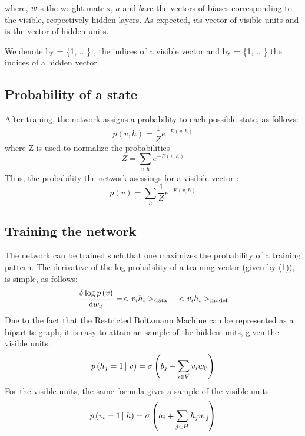 where, $w_{{{}}}$is the weight matrix, $a$ and $b$are the
vectors of biases corresponding to the visible, respectively hidden layers. As
expected, $v$is vector of visible units and  is the vector of
hidden units.

We denote by  = \{1, ..  \} , the
indices of a visible vector and by  = \{1, .. 
\} the indices of a hidden vector.



\subsection{Probability of a state}

After traning, the network assigns a probability to each possible state, as
follows:
\[ p \left( v, h \right) = \frac{1}{Z} e^{- E \left( v, h \right)} \]
where Z is used to normalize the probabilities
\[ Z = \sum_{v, h} e^{- E \left( v, h \right)} \]
Thus, the probability the network asessings for a visibile vector :
\begin{equation}
  p \left( v \right) = \sum_h \frac{1}{Z} e^{- E \left( v, h \right)}
\end{equation}

\subsection{Training the network}

The network can be trained such that one maximizes the probability of a training
pattern. The derivative of the log probability of a training vector (given by
(1)), is simple, as follows:
\[ \frac{\delta \log p \left( v \right)}{\delta w_{\operatorname{ij}}} = < v_i h_i
   >_{\operatorname{data}} - < v_i h_i >_{\operatorname{model}} \]
Due to the fact that the Restricted Boltzmann Machine can be represented as a bipartite graph, it is easy
to attain an  sample of the hidden units, given the
visible units.
\begin{equation}
  p \left( h_j = 1 \left|  \right. v \right) = \sigma \left( b_j + \sum_{i \in
  V} v_i w_{\operatorname{ij}} \right)
\end{equation}
For the visible units, the same formula gives a  sample of
the visible units.
\begin{equation}
  p \left( v_i = 1 \left|  \right. h \right) = \sigma \left( a_i + \sum_{j \in
  H} h_j w_{\operatorname{ij}} \right)
\end{equation}


